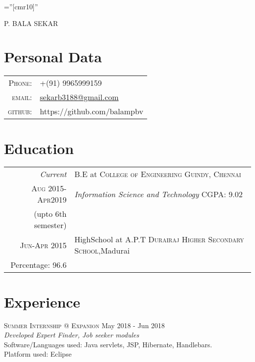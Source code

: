 \documentclass[a4paper,10pt]{article}
\begin{document}

\pagestyle{empty} %

\font\fb=''[cmr10]'' %

\par{\centering
		{\Huge P. BALA \textsc{SEKAR}
	}\bigskip\par}

\section{Personal Data}

\begin{tabular}{rl}
    \textsc{Phone:}     & +(91) 9965999159\\
    \textsc{email:}     & 
    \href{mailto:sekarb3188@gmail.com}{sekarb3188@gmail.com}\\
    \textsc{github:}    & https://github.com/balampbv
\end{tabular}

\section{Education}
\begin{tabular}{r|p{11cm}}
 \emph{Current} & B.E at \textsc{College of Engineering Guindy, Chennai}\\\textsc{Aug 2015-Apr2019}&\emph{Information Science and Technology} \qquad \qquad \qquad \qquad \quad CGPA: 9.02\\{}\hfill(upto 6th semester)\multicolumn{2}{c}{} \\
 \textsc{Jun-Apr 2015} & HighSchool at \textsc{A.P.T Durairaj Higher Secondary School},Madurai\\    \hfill Percentage: 96.6\multicolumn{2}{c}{}
\end{tabular}

\section{Experience}
{\textsc{Summer Internship @ Expanion} \hfill May 2018 - Jun 2018 \\
\emph{Developed Expert Finder, Job seeker modules}\\  
Software/Languages used: Java servlets, JSP, Hibernate, Handlebars.\\
Platform used: Eclipse} \\
\end{document}
